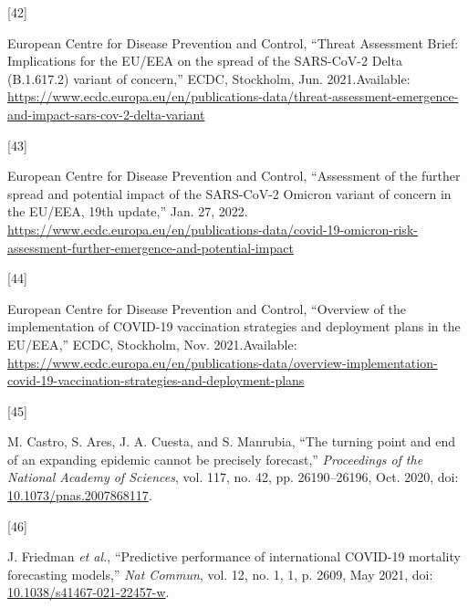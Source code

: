 \documentclass[
]{article}
\newlength{\cslhangindent}
\newlength{\csllabelwidth}
\newlength{\cslentryspacingunit} %
\newenvironment{CSLReferences}[2] %
 {%
  \setlength{\parindent}{0pt}
  \ifodd #1
  \let\oldpar\par
  \def\par{\hangindent=\cslhangindent\oldpar}
  \fi
  \setlength{\parskip}{#2\cslentryspacingunit}
 }%
 {}
\newcommand{\CSLLeftMargin}[1]{\parbox[t]{\csllabelwidth}{#1}}
\newcommand{\CSLRightInline}[1]{\parbox[t]{\linewidth - \csllabelwidth}{#1}\break}
\providecommand{\DIFaddbegin}{} %
\providecommand{\DIFaddend}{} %
\providecommand{\DIFdelbegin}{} %
\providecommand{\DIFdelend}{} %
\newcommand{\DIFscaledelfig}{0.5}
\newlength{\DIFdelgraphicswidth} %
\newlength{\DIFdelgraphicsheight} %
\newcommand{\DIFaddincludegraphics}[2][]{{\color{blue}\fbox{\DIFOincludegraphics[#1]{#2}}}} %
\newcommand{\DIFdelincludegraphics}[2][]{%
\sbox{\DIFdelgraphicsbox}{\DIFOincludegraphics[#1]{#2}}%
\settoboxwidth{\DIFdelgraphicswidth}{\DIFdelgraphicsbox} %
\settoboxtotalheight{\DIFdelgraphicsheight}{\DIFdelgraphicsbox} %
\scalebox{\DIFscaledelfig}{%
\parbox[b]{\DIFdelgraphicswidth}{\usebox{\DIFdelgraphicsbox}\\[-\baselineskip] \rule{\DIFdelgraphicswidth}{0em}}\llap{\resizebox{\DIFdelgraphicswidth}{\DIFdelgraphicsheight}{%
\setlength{\unitlength}{\DIFdelgraphicswidth}%
\begin{picture}(1,1)%
\thicklines\linethickness{2pt} %
{\color[rgb]{1,0,0}\put(0,0){\framebox(1,1){}}}%
{\color[rgb]{1,0,0}\put(0,0){\line( 1,1){1}}}%
{\color[rgb]{1,0,0}\put(0,1){\line(1,-1){1}}}%
\end{picture}%
}\hspace*{3pt}}} %
} %
\DeclareRobustCommand{\DIFaddbegin}{\DIFOaddbegin \let\includegraphics\DIFaddincludegraphics} %
\DeclareRobustCommand{\DIFaddend}{\DIFOaddend \let\includegraphics\DIFOincludegraphics} %
\DeclareRobustCommand{\DIFdelbegin}{\DIFOdelbegin \let\includegraphics\DIFdelincludegraphics} %
\DeclareRobustCommand{\DIFdelend}{\DIFOaddend \let\includegraphics\DIFOincludegraphics} %
\begin{document}
\begin{CSLReferences}{0}{0}
\leavevmode{}%
\DIFdelbegin %
\DIFdelend \DIFaddbegin \CSLLeftMargin{{[}42{]} }
\DIFaddend \CSLRightInline{European Centre for Disease Prevention and Control, {``Threat {Assessment Brief}: {Implications} for the {EU}/{EEA} on the spread of the {SARS-CoV-2 Delta} ({B}.1.617.2) variant of concern,''} {ECDC}, {Stockholm}, Jun. 2021.Available: \url{https://www.ecdc.europa.eu/en/publications-data/threat-assessment-emergence-and-impact-sars-cov-2-delta-variant}}

\leavevmode{}%
\DIFdelbegin %
\DIFdelend \DIFaddbegin \CSLLeftMargin{{[}43{]} }
\DIFaddend \CSLRightInline{European Centre for Disease Prevention and Control, {``Assessment of the further spread and potential impact of the {SARS-CoV-2 Omicron} variant of concern in the {EU}/{EEA}, 19th update,''} Jan. 27, 2022. \url{https://www.ecdc.europa.eu/en/publications-data/covid-19-omicron-risk-assessment-further-emergence-and-potential-impact}}

\leavevmode{}%
\DIFdelbegin %
\DIFdelend \DIFaddbegin \CSLLeftMargin{{[}44{]} }
\DIFaddend \CSLRightInline{European Centre for Disease Prevention and Control, {``Overview of the implementation of {COVID-19} vaccination strategies and deployment plans in the {EU}/{EEA},''} {ECDC}, {Stockholm}, Nov. 2021.Available: \url{https://www.ecdc.europa.eu/en/publications-data/overview-implementation-covid-19-vaccination-strategies-and-deployment-plans}}

\leavevmode{}%
\DIFdelbegin %
\DIFdelend \DIFaddbegin \CSLLeftMargin{{[}45{]} }
\DIFaddend \CSLRightInline{M. Castro, S. Ares, J. A. Cuesta, and S. Manrubia, {``The turning point and end of an expanding epidemic cannot be precisely forecast,''} \emph{Proceedings of the National Academy of Sciences}, vol. 117, no. 42, pp. 26190--26196, Oct. 2020, doi: \href{https://doi.org/10.1073/pnas.2007868117}{10.1073/pnas.2007868117}.}

\leavevmode{}%
\DIFdelbegin %
\DIFdelend \DIFaddbegin \CSLLeftMargin{{[}46{]} }
\DIFaddend \CSLRightInline{J. Friedman \emph{et al.}, {``Predictive performance of international {COVID-19} mortality forecasting models,''} \emph{Nat Commun}, vol. 12, no. 1, 1, p. 2609, May 2021, doi: \href{https://doi.org/10.1038/s41467-021-22457-w}{10.1038/s41467-021-22457-w}.}


\end{CSLReferences}
\end{document}
